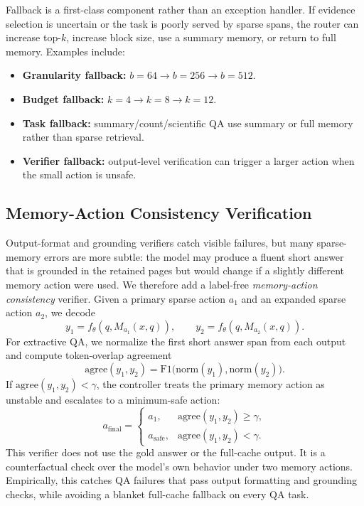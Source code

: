 \documentclass{article}
\begin{document}
Fallback is a first-class component rather than an exception handler.
If evidence selection is uncertain or the task is poorly served by sparse spans, the router can increase top-$k$, increase block size, use a summary memory, or return to full memory.
Examples include:
\begin{itemize}[leftmargin=1.4em,itemsep=0.2em]
    \item \textbf{Granularity fallback:} $b=64 \rightarrow b=256 \rightarrow b=512$.
    \item \textbf{Budget fallback:} $k=4 \rightarrow k=8 \rightarrow k=12$.
    \item \textbf{Task fallback:} summary/count/scientific QA use summary or full memory rather than sparse retrieval.
    \item \textbf{Verifier fallback:} output-level verification can trigger a larger action when the small action is unsafe.
\end{itemize}

\subsection{Memory-Action Consistency Verification}
\label{sec:consistency-verifier}

Output-format and grounding verifiers catch visible failures, but many sparse-memory errors are more subtle:
the model may produce a fluent short answer that is grounded in the retained pages but would change if a slightly different memory action were used.
We therefore add a label-free \emph{memory-action consistency} verifier.
Given a primary sparse action $a_1$ and an expanded sparse action $a_2$, we decode
\begin{equation}
    y_1 = f_\theta(q, M_{a_1}(x,q)),
    \qquad
    y_2 = f_\theta(q, M_{a_2}(x,q)).
\end{equation}
For extractive QA, we normalize the first short answer span from each output and compute token-overlap agreement
\begin{equation}
    \mathrm{agree}(y_1,y_2)
    =
    \mathrm{F1}\bigl(\mathrm{norm}(y_1),\mathrm{norm}(y_2)\bigr).
\end{equation}
If $\mathrm{agree}(y_1,y_2)<\gamma$, the controller treats the primary memory action as unstable and escalates to a minimum-safe action:
\begin{equation}
    a_{\mathrm{final}}
    =
    \begin{cases}
    a_1, & \mathrm{agree}(y_1,y_2)\geq \gamma,\\
    a_{\mathrm{safe}}, & \mathrm{agree}(y_1,y_2)<\gamma.
    \end{cases}
\end{equation}
This verifier does not use the gold answer or the full-cache output.
It is a counterfactual check over the model's own behavior under two memory actions.
Empirically, this catches QA failures that pass output formatting and grounding checks, while avoiding a blanket full-cache fallback on every QA task.
\end{document}
